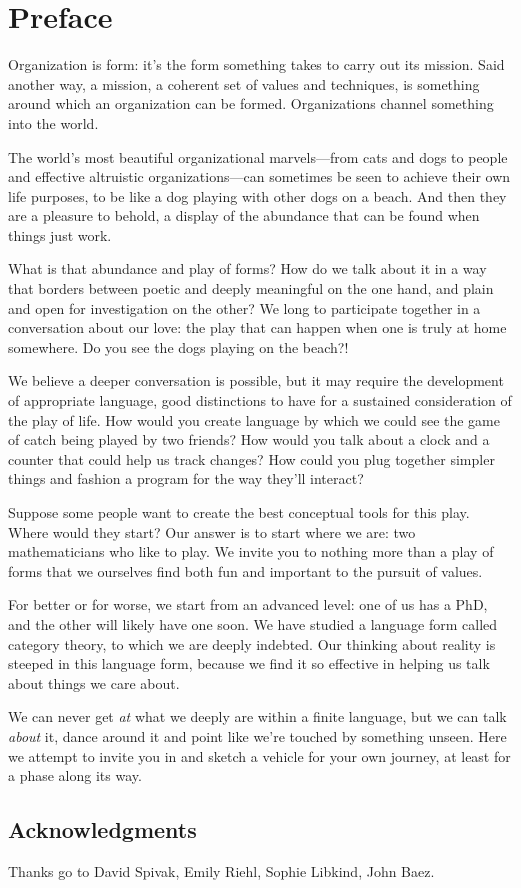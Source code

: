 \documentclass[DynamicalBook]{subfiles}
\begin{document}
%


\setcounter{chapter}{0}%


\chapter{Preface}\label{chapter.0}

Organization is form: it's the form something takes to carry out its mission. Said another way, a mission, a coherent set of values and techniques, is something around which an organization can be formed. Organizations channel something into the world.

 The world's most beautiful organizational marvels---from cats and dogs to people and effective altruistic organizations---can sometimes be seen to achieve their own life purposes, to be like a dog playing with other dogs on a beach. And then they are a pleasure to behold, a display of the abundance that can be found when things just work.

What is that abundance and play of forms? How do we talk about it in a way that borders between poetic and deeply meaningful on the one hand, and plain and open for investigation on the other? We long to participate together in a conversation about our love: the play that can happen when one is truly at home somewhere. Do you see the dogs playing on the beach?!

We believe a deeper conversation is possible, but it may require the development of appropriate language, good distinctions to have for a sustained consideration of the play of life. How would you create language by which we could see the game of catch being played by two friends? How would you talk about a clock and a counter that could help us track changes? How could you  plug together simpler things and fashion a program for the way they'll interact?

Suppose some people want to create the best conceptual tools for this play. Where would they start? Our answer is to start where we are: two mathematicians who like to play. We invite you to nothing more than a play of forms that we ourselves find both fun and important to the pursuit of  values.

For better or for worse, we start from an advanced level: one of us has a PhD, and the other will likely have one soon. We have studied a language form called category theory, to which we are deeply indebted. Our thinking about reality is steeped in this language form, because we find it so effective in helping us talk about things we care about.

We can never get \emph{at} what we deeply are within a finite language, but we can talk \emph{about} it, dance around it and point like we're touched by something unseen. Here we attempt to invite you in and sketch a vehicle for your own journey, at least for a phase along its way. 


\section*{Acknowledgments}

Thanks go to David Spivak, Emily Riehl, Sophie Libkind, John Baez.
\end{document}
